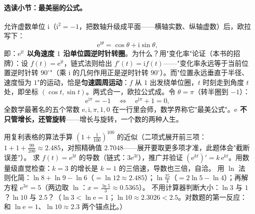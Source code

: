 \paragraph{选读小节：最美丽的公式。}允许虚数单位 $\mathrm{i}$（$\mathrm{i}^2 = -1$，把数轴升级成平面——横轴实数、纵轴虚数）后，欧拉写下：
\[
\mathrm{e}^{\mathrm{i}\theta} = \cos\theta + \mathrm{i}\sin\theta ,
\]
即：\textbf{$\mathrm{e}^{\mathrm{i}t}$ 以角速度 $1$ 沿单位圆逆时针转圈}。为什么？用"变化率"论证（本书的招牌）：设 $f(t) = \mathrm{e}^{\mathrm{i}t}$，链式法则给出 $f'(t) = \mathrm{i}f(t)$——"变化率永远等于当前位置逆时针转 $90^\circ$"（乘 $\mathrm{i}$ 的几何作用正是逆时针转 $90^\circ$）。而"位置永远垂直于半径、速度恒为 $1$"的运动，恰是\textbf{匀速圆周运动}：$f$ 从 $1$ 出发绕单位圈，$t$ 时刻走到角度 $t$ 处，即坐标 $(\cos t, \sin t)$。两式合一，欧拉公式成。令 $\theta = \pi$（转半圈到 $-1$）：
\[
\mathrm{e}^{\mathrm{i}\pi} = -1 \quad\Longleftrightarrow\quad \mathrm{e}^{\mathrm{i}\pi} + 1 = 0 ,
\]
全数学最著名的五个常数 $\mathrm{e}, \mathrm{i}, \pi, 1, 0$ 在一行里会师，数学界称它"最美公式"。\textbf{$\mathrm{e}$ 不只管增长，还管旋转}——增长与旋转，一个数的两种人生。

\begin{dongshou}
\begin{itemize}
  \yisi 用复利表格的算法手算 $(1+\tfrac1{100})^{100}$ 的近似（二项式展开前三项：$1 + 1 + \tfrac{99}{200} \approx 2.485$，对照精确值 $2.7048$——展开要取更多项才准，此题体会"截断误差"）。
  \yier 求 $f(t) = \mathrm{e}^{3t}$ 的导数（链式：$3\mathrm{e}^{3t}$），推广并验证 $(\mathrm{e}^{kt})' = k\,\mathrm{e}^{kt}$。用数量级直觉检查：$k = 3$ 的增长是 $k=1$ 的三倍速，导数也三倍，自洽。
  \yier 用 $\ln$ 法则化简：$\ln 8 + \ln 9 - \ln 6$（$=\ln 12 \approx 2.485$）；$\ln\tfrac{25}{4}$（$=2\ln5 - \ln4$）；再解方程 $\mathrm{e}^{3x} = 5$（两边取 $\ln$：$x = \tfrac{\ln 5}{3} \approx 0.5365$）。
  \yisi 不用计算器判断大小：$\ln 3$ 与 $1$？$\ln 10$ 与 $2.5$？（$\ln 3 < \ln \mathrm{e} = 1$；$\ln 10 \approx 2.3026 < 2.5$。对数题的第一反应：和 $\ln\mathrm{e}=1$、$\ln 10\approx2.3$ 两个锚点比。）
\end{itemize}
\end{dongshou}


